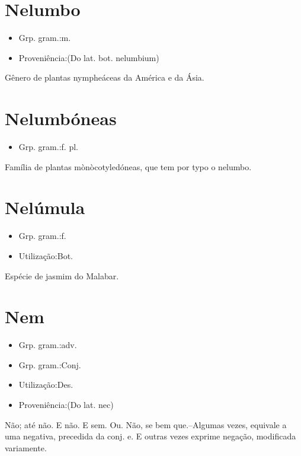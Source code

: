 \section{Nelumbo}
\begin{itemize}
\item {Grp. gram.:m.}
\end{itemize}
\begin{itemize}
\item {Proveniência:(Do lat. bot. \textunderscore nelumbium\textunderscore )}
\end{itemize}
Gênero de plantas nympheáceas da América e da Ásia.
\section{Nelumbóneas}
\begin{itemize}
\item {Grp. gram.:f. pl.}
\end{itemize}
Família de plantas mònòcotyledóneas, que tem por typo o \textunderscore nelumbo\textunderscore .
\section{Nelúmula}
\begin{itemize}
\item {Grp. gram.:f.}
\end{itemize}
\begin{itemize}
\item {Utilização:Bot.}
\end{itemize}
Espécie de jasmim do Malabar.
\section{Nem}
\begin{itemize}
\item {Grp. gram.:adv.}
\end{itemize}
\begin{itemize}
\item {Grp. gram.:Conj.}
\end{itemize}
\begin{itemize}
\item {Utilização:Des.}
\end{itemize}
\begin{itemize}
\item {Proveniência:(Do lat. \textunderscore nec\textunderscore )}
\end{itemize}
Não; até não.
E não.
E sem.
Ou.
Não, se bem que.--Algumas vezes, equivale a uma negativa, precedida da conj. \textunderscore e\textunderscore . E outras vezes exprime negação, modificada variamente.
